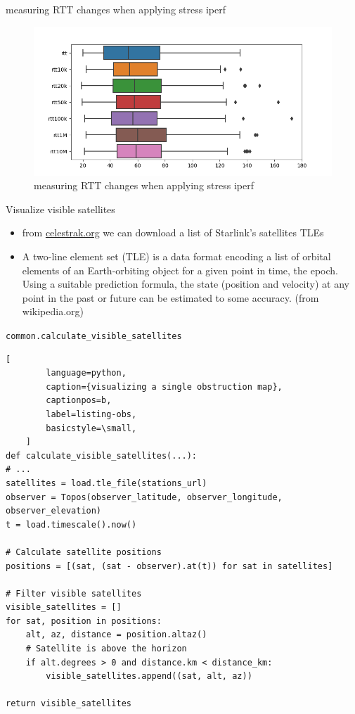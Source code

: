 \documentclass[NET,english,beameralt]{tumbeamer}
\begin{document}
\begin{frame}{measuring RTT changes when applying stress iperf}
\begin{figure}
    \includegraphics[width=1\textwidth]{pics/rtt-iperf-stress.png}
    \caption[short]{measuring RTT changes when applying stress iperf}
\end{figure}
\end{frame}

\begin{frame}{Visualize visible satellites}
\begin{itemize}
    \item from \href{celestrak.org}{celestrak.org} we can download a list of Starlink's satellites TLEs
    \item A two-line element set (TLE) is a data format encoding a list of orbital elements of an Earth-orbiting object for a given point in time, the epoch. Using a suitable prediction formula, the state (position and velocity) at any point in the past or future can be estimated to some accuracy. (from wikipedia.org)
\end{itemize}
\end{frame}

\begin{frame}[fragile]{\texttt{common.calculate\_visible\_satellites}}
    \begin{lstlisting}[
        language=python,
        caption={visualizing a single obstruction map},
        captionpos=b,
        label=listing-obs,
        basicstyle=\small,
    ]
def calculate_visible_satellites(...):
# ...
satellites = load.tle_file(stations_url)
observer = Topos(observer_latitude, observer_longitude, observer_elevation)
t = load.timescale().now()

# Calculate satellite positions
positions = [(sat, (sat - observer).at(t)) for sat in satellites]

# Filter visible satellites
visible_satellites = []
for sat, position in positions:
    alt, az, distance = position.altaz()
    # Satellite is above the horizon
    if alt.degrees > 0 and distance.km < distance_km:
        visible_satellites.append((sat, alt, az))

return visible_satellites
    \end{lstlisting}
\end{frame}
\end{document}
